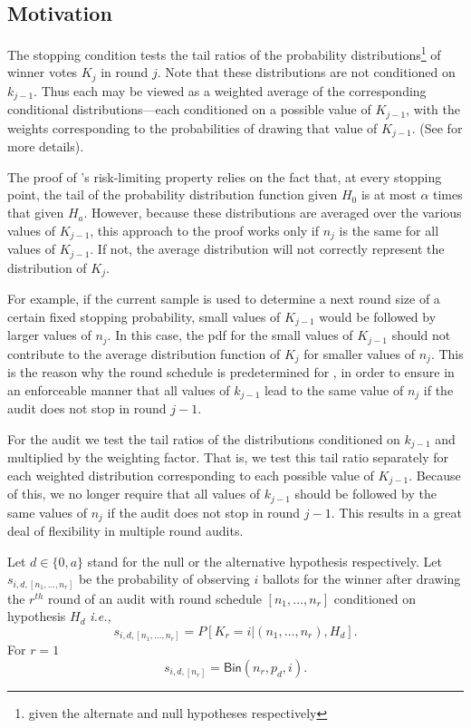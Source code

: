 \subsection{Motivation}
\label{sec:prov_motivation}
The \Minerva stopping condition tests the tail ratios of the probability distributions\footnote{given the alternate and null hypotheses respectively} of winner votes $K_j$ in round $j$. Note that these distributions are not conditioned on $k_{j-1}$. Thus each may be viewed as a weighted average of the corresponding conditional distributions---each conditioned on a possible value of $K_{j-1}$, with the weights corresponding to the probabilities of drawing that value of $K_{j-1}$. (See \cite{usenix_minerva} for more details). 

The proof of \Minerva's risk-limiting property relies on the fact that, at every stopping point, the tail of the probability distribution function given $H_0$ is at most $\alpha$ times that given $H_a$. However, because these distributions are averaged over the various values of $K_{j-1}$, this approach to the proof works only if $n_j$ is the same for all values of $K_{j-1}$. If not, the average distribution will not correctly represent the distribution of $K_j$. 

For example, if the current sample is used to determine a next round size of a certain fixed stopping probability, small values of $K_{j-1}$ would be followed by larger values of $n_j$.  In this case, the pdf for the small values of $K_{j-1}$ should not contribute to the average distribution function of $K_j$ for smaller values of $n_j$. This is the reason why the round schedule is predetermined for \Minerva, in order to ensure in an enforceable manner that all values of $k_{j-1}$ lead to the same value of $n_j$ if the audit does not stop in round $j-1$. 

For the \Providence audit we test the tail ratios of the distributions conditioned on $k_{j-1}$ and multiplied by the weighting factor. That is, we test this tail ratio separately for each weighted distribution corresponding to each possible value of $K_{j-1}$. Because of this, we no longer require that all values of $k_{j-1}$ should be followed by the same values of $n_j$ if the audit does not stop in round $j-1$. This results in a great deal of flexibility in multiple round audits. 

\begin{definition}
Let $d \in \{0, a\}$ stand for the null or the alternative hypothesis respectively.
Let $s_{i, d, [n_1, \ldots, n_r]}$ be the probability of observing $i$ ballots for the winner after drawing the $r^{th}$ round of an audit with round schedule $[n_1, \ldots, n_r]$ conditioned on hypothesis $H_d$ \textit{i.e.,} 
\[
s_{i, d, [n_1, \ldots, n_r]} = P\left[K_r = i | (n_1, \ldots, n_r), H_d\right]. 
\]
For $r = 1$ 
\[
 s_{i, d, [n_r]} = \mathsf{Bin}(n_r, p_d, i).
\]
\end{definition}


